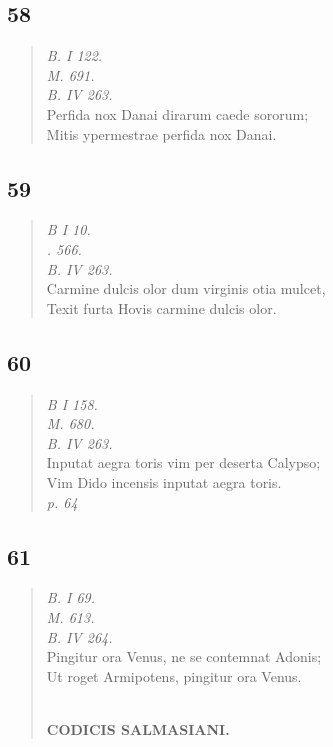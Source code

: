 \documentclass[11pt, a4paper]{report}
\begin{document}
            \subsection*{58}
      \begin{verse}
      \textit{B. I 122.} \\ \textit{M. 691.} \\ \textit{B. IV 263.} \\ Perfida nox Danai dirarum caede sororum; \\ Mitis ypermestrae perfida nox Danai. \\ 
      \end{verse}
  
            \subsection*{59}
      \begin{verse}
      \textit{B I 10.} \\ \textit{. 566.} \\ \textit{B. IV 263.} \\ Carmine dulcis olor dum virginis otia mulcet, \\ Texit furta Hovis carmine dulcis olor. \\ 
      \end{verse}
  
            \subsection*{60}
      \begin{verse}
      \textit{B I 158.} \\ \textit{M. 680.} \\ \textit{B. IV 263.} \\ Inputat aegra toris vim per deserta Calypso; \\ Vim Dido incensis inputat aegra toris. \\ \textit{p. 64} \\ 
      \end{verse}
  
            \subsection*{61}
      \begin{verse}
      \textit{B. I 69.} \\ \textit{M. 613.} \\ \textit{B. IV 264.} \\ Pingitur ora Venus, ne se contemnat Adonis; \\ Ut roget Armipotens, pingitur ora Venus. \\ 
        ﻿\pagebreak 
    \begin{center} \textbf{CODICIS SALMASIANI.} \end{center} \marginpar{[107]} 
      \end{verse}
  
\end{document}
